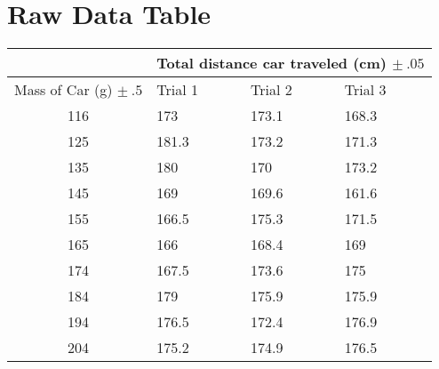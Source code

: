 \documentclass[12pt]{article}
\begin{document}
\section{Raw Data Table}
\begin{table}[H]
	\centering
	\begin{tabularx}{0.75\textwidth}{ |c| *{3}{X|}}
		\hline
		                            & \multicolumn{3}{c|}{Total distance car traveled (cm) \(\pm\ .05\)}                     \\ \hline
		Mass of Car (g) \(\pm\ .5\) & Trial 1                                                            & Trial 2 & Trial 3 \\ \hline
		116                         & 173                                                                & 173.1   & 168.3   \\ \hline
		125                         & 181.3                                                              & 173.2   & 171.3   \\ \hline
		135                         & 180                                                                & 170     & 173.2   \\ \hline
		145                         & 169                                                                & 169.6   & 161.6   \\ \hline
		155                         & 166.5                                                              & 175.3   & 171.5   \\ \hline
		165                         & 166                                                                & 168.4   & 169     \\ \hline
		174                         & 167.5                                                              & 173.6   & 175     \\ \hline
		184                         & 179                                                                & 175.9   & 175.9   \\ \hline
		194                         & 176.5                                                              & 172.4   & 176.9   \\ \hline
		204                         & 175.2                                                              & 174.9   & 176.5   \\ \hline
	\end{tabularx}
\end{table}
\end{document}
